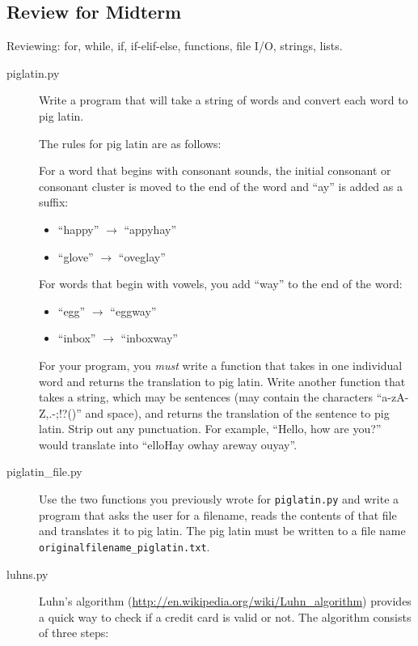 \documentclass[11pt]{cselabheader}
\begin{document}
\subsection{Review for Midterm}
\label{subsec:reviewex}

Reviewing: for, while, if, if-elif-else, functions, file I/O, strings, lists. 

\begin{description}
  \item[piglatin.py] Write a program that will take a string of words and
    convert each word to pig latin. 

    The rules for pig latin are as follows:

    For a word that begins with consonant sounds, the initial consonant or
    consonant cluster is moved to the end of the word and ``ay'' is added as a
    suffix:
    \begin{itemize}
      \item ``happy'' $\to$ ``appyhay''
      \item ``glove'' $\to$ ``oveglay''
    \end{itemize}

    For words that begin with vowels, you add ``way'' to the end of the word:
    \begin{itemize}
      \item ``egg'' $\to$ ``eggway''
      \item ``inbox'' $\to$ ``inboxway''
    \end{itemize}

    For your program, you \emph{must} write a function that takes in one
    individual word and returns the translation to pig latin. Write another
    function that takes a string, which may be sentences (may contain the
    characters ``a-zA-Z,.-;!?()'' and space), and returns the translation of the
    sentence to pig latin. Strip out any punctuation. For example, ``Hello, how
    are you?'' would translate into ``elloHay owhay areway ouyay''.

  \item[piglatin\_file.py] Use the two functions you previously wrote for
    \texttt{piglatin.py} and write a program that asks the user for a filename,
    reads the contents of that file and translates it to pig latin. The pig
    latin must be written to a file name
    \texttt{originalfilename\_piglatin.txt}.

  \item[luhns.py] Luhn's algorithm
    (\url{http://en.wikipedia.org/wiki/Luhn_algorithm}) provides a quick way to
    check if a credit card is valid or not. The algorithm consists of three
    steps:


\end{description}
\end{document}
